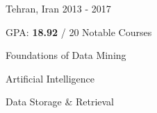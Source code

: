 \begin{cventries}
	{Tehran, Iran} %
	{2013 - 2017} %
	{
		GPA: \textbf{18.92} / 20
		\newline
		\textcolor{awesome}{Notable Courses}
		\vspace{-.4cm}
		\begin{multicols}{3}
			\begin{cvitems}
\iffalse                
				\item {Foundations of Data Mining \hspace{0.5cm} 20}
				\item {Stochastic Processes \hspace{0.5cm} 20}
				\item {Artificial Intelligence \hspace{0.5cm} 20}
				\item {Engineering Statistics \hspace{0.5cm} 17}
%
                \item {Data Storage \& Retrieval \hspace{0.5cm} 20}
                \item {Theory of Machines \& Languages \hspace{0.5cm} 20}                
                \item {Principles of Database Design \hspace{0.5cm} 18.8}
                \item {Design of Algorithms \hspace{0.5cm} 20}
                \item {Data Struct. \& Algorithms \hspace{0.5cm} 19.7}
%
                \item {Advanced Computer Programming \hspace{0.5cm} 20}
                \item {Discrete Structures \hspace{0.5cm} 15}
                \item {Principles of Computer \& Prog. \hspace{0.5cm} 20}
\fi
    			\item {Foundations of Data Mining}
				\item {Artificial Intelligence}
                \item {Data Storage \& Retrieval}
			\end{cvitems}
		\end{multicols}
	}
    \vspace{-1cm}
\end{cventries}
